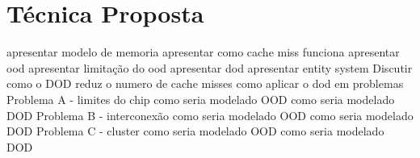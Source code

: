 \chapter{Técnica Proposta}
    apresentar modelo de memoria
    apresentar como cache miss funciona
    apresentar ood
    apresentar limitação do ood
    apresentar dod
    apresentar entity system
    Discutir como o DOD reduz o numero de cache misses
    como aplicar o dod em problemas
        Problema A - limites do chip
            como seria modelado OOD
            como seria modelado DOD
        Problema B - interconexão
            como seria modelado OOD
            como seria modelado DOD
        Problema C - cluster
            como seria modelado OOD
            como seria modelado DOD